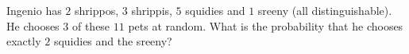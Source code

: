 Ingenio has $2$ shrippos, $3$ shrippis, $5$ squidies and $1$ sreeny (all distinguishable). He chooses $3$ of these $11$ pets at random. What is the probability that he chooses exactly $2$ squidies and the sreeny?
